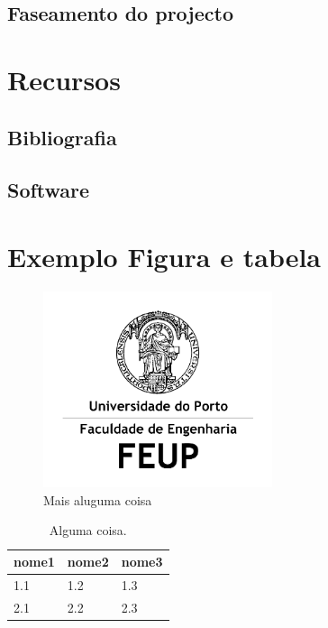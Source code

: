 \documentclass[a4paper, 12pt, twoside]{scrreprt}
\begin{document}
\section{Faseamento do projecto}

\chapter{Recursos}
\section{Bibliografia}
\section{Software}


\chapter{Exemplo Figura e tabela}

\begin{figure}[!htb]
\centering
\includegraphics[width=0.60\textwidth]{FEUP_Logo}
\caption[alguma coisa.]{Mais aluguma coisa} \label{fig:Array}
\end{figure}

\begin{table}[htb]
\centering
\caption{Alguma coisa.}
     \sffamily \begin{tabularx}{1.0\textwidth}{ p{5cm}  p{5cm}  p{5cm} }
    \hline
   \textbf{nome1} \hfill & \textbf{nome2} \hfill & \textbf{nome3} \\ \hline
    1.1 & 1.2 & 1.3\\
    2.1 & 2.2 & 2.3\\ \hline
    \end{tabularx} \normalfont
\label{table:Emissivity}
\end{table}
\end{document}
